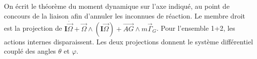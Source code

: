 \begin{corrigebox}
On écrit le théorème du moment dynamique sur l'axe indiqué, au
            point de concours de la liaison afin d'annuler les inconnues de réaction.
            Le membre droit est la projection de
            $\mathbf I\dot{\vec\Omega}+\vec\Omega\wedge(\mathbf I\vec\Omega)+
            \overrightarrow{AG}\wedge m\vec\Gamma_G$. Pour l'ensemble 1+2, les actions
            internes disparaissent. Les deux projections donnent le système différentiel
            couplé des angles $\theta$ et $\varphi$.
\end{corrigebox}
